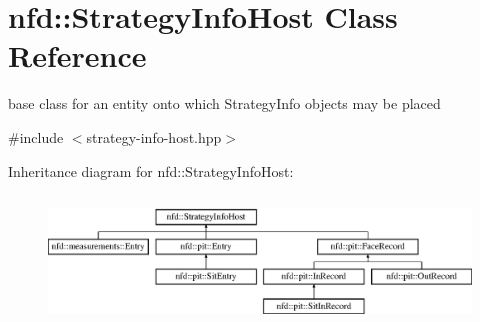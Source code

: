 \hypertarget{classnfd_1_1StrategyInfoHost}{}\section{nfd\+:\+:Strategy\+Info\+Host Class Reference}
\label{classnfd_1_1StrategyInfoHost}


base class for an entity onto which Strategy\+Info objects may be placed  




{\ttfamily \#include $<$strategy-\/info-\/host.\+hpp$>$}

Inheritance diagram for nfd\+:\+:Strategy\+Info\+Host\+:\begin{figure}[H]
\begin{center}
\leavevmode
\includegraphics[height=3.500000cm]{classnfd_1_1StrategyInfoHost}
\end{center}
\end{figure}
